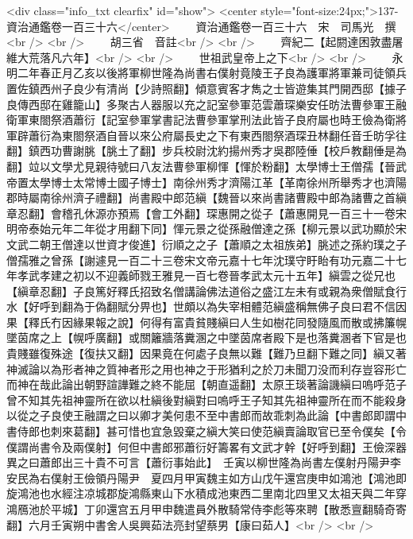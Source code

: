 <div class="info_txt clearfix" id="show">
<center style="font-size:24px;">137-資治通鑑卷一百三十六</center>
  　　資治通鑑卷一百三十六　宋　司馬光　撰<br />
<br />
　　胡三省　音註<br />
<br />
　　齊紀二【起閼達困敦盡屠維大荒落凡六年】<br />
<br />
　　世祖武皇帝上之下<br />
<br />
　　永明二年春正月乙亥以後將軍柳世隆為尚書右僕射竟陵王子良為護軍將軍兼司徒領兵置佐鎮西州子良少有清尚【少詩照翻】傾意賓客才雋之士皆遊集其門開西邸【據子良傳西邸在雞籠山】多聚古人器服以充之記室參軍范雲蕭琛樂安任昉法曹參軍王融衛軍東閤祭酒蕭衍【記室參軍掌書記法曹參軍掌刑法此皆子良府屬也時王儉為衛將軍辟蕭衍為東閤祭酒自晉以來公府屬長史之下有東西閤祭酒琛丑林翻任音壬昉孚往翻】鎮西功曹謝朓【朓土了翻】步兵校尉沈約揚州秀才吳郡陸倕【校戶教翻倕是為翻】竝以文學尤見親待號曰八友法曹參軍柳惲【惲於粉翻】太學博士王僧孺【晉武帝置太學博士太常博士國子博士】南徐州秀才濟陽江革【革南徐州所舉秀才也濟陽郡時屬南徐州濟子禮翻】尚書殿中郎范縝【魏晉以來尚書諸曹殿中郎為諸曹之首縝章忍翻】會稽孔休源亦預焉【會工外翻】琛惠開之從子【蕭惠開見一百三十一卷宋明帝泰始元年二年從才用翻下同】惲元景之從孫融僧達之孫【柳元景以武功顯於宋文武二朝王僧達以世資才俊進】衍順之之子【蕭順之太祖族弟】朓述之孫約璞之子僧孺雅之曾孫【謝遽見一百二十三卷宋文帝元嘉十七年沈璞守盱眙有功元嘉二十七年孝武孝建之初以不迎義師戮王雅見一百七卷晉孝武太元十五年】縝雲之從兄也【縝章忍翻】子良篤好釋氏招致名僧講論佛法道俗之盛江左未有或親為衆僧賦食行水【好呼到翻為于偽翻賦分畀也】世頗以為失宰相體范縝盛稱無佛子良曰君不信因果【釋氏冇因緣果報之說】何得有富貴貧賤縝曰人生如樹花同發隨風而散或拂簾幌墜茵席之上【幌呼廣翻】或關籬牆落糞溷之中墜茵席者殿下是也落糞溷者下官是也貴賤雖復殊途【復扶又翻】因果竟在何處子良無以難【難乃旦翻下難之同】縝又著神滅論以為形者神之質神者形之用也神之于形猶利之於刀未聞刀没而利存豈容形亡而神在哉此論出朝野諠譁難之終不能屈【朝直遥翻】太原王琰著論譏縝曰嗚呼范子曾不知其先祖神靈所在欲以杜縝後對縝對曰嗚呼王子知其先祖神靈所在而不能殺身以從之子良使王融謂之曰以卿才美何患不至中書郎而故乖刺為此論【中書郎即謂中書侍郎也刺來葛翻】甚可惜也宜急毀棄之縝大笑曰使范縝賣論取官已至令僕矣【令僕謂尚書令及兩僕射】何但中書郎邪蕭衍好籌畧有文武才幹【好呼到翻】王儉深器異之曰蕭郎出三十貴不可言【蕭衍事始此】　壬寅以柳世隆為尚書左僕射丹陽尹李安民為右僕射王儉領丹陽尹　夏四月甲寅魏主如方山戊午還宫庚申如鴻池【鴻池即旋鴻池也水經注凉城郡旋鴻縣東山下水積成池東西二里南北四里又太祖天與二年穿鴻鴈池於平城】丁卯還宫五月甲申魏遣員外散騎常侍李彪等來聘【散悉亶翻騎奇寄翻】六月壬寅朔中書舍人吳興茹法亮封望蔡男【康曰茹人】<br />
<br />

